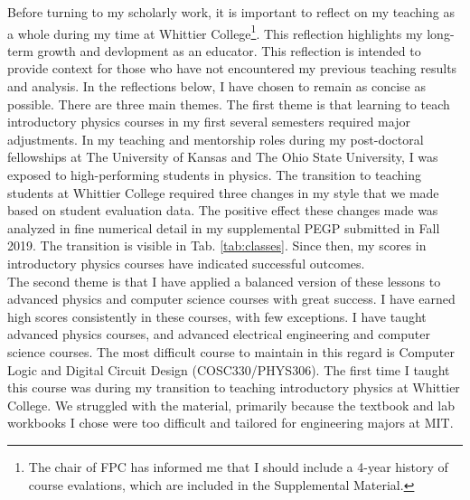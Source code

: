 \documentclass[../../../main.tex]{subfiles}
\begin{document}
Before turning to my scholarly work, it is important to reflect on my teaching as a whole during my time at Whittier College\footnote{The chair of FPC has informed me that I should include a 4-year history of course evalations, which are included in the Supplemental Material.}.  This reflection highlights my long-term growth and devlopment as an educator.  This reflection is intended to provide context for those who have not encountered my previous teaching results and analysis.  In the reflections below, I have chosen to remain as concise as possible.  There are three main themes.  The first theme is that learning to teach introductory physics courses in my first several semesters required major adjustments.  In my teaching and mentorship roles during my post-doctoral fellowships at The University of Kansas and The Ohio State University, I was exposed to high-performing students in physics.  The transition to teaching students at Whittier College required three changes in my style that we made based on student evaluation data.  The positive effect these changes made was analyzed in fine numerical detail in my supplemental PEGP submitted in Fall 2019.  The transition is visible in Tab. \ref{tab:classes}. Since then, my scores in introductory physics courses have indicated successful outcomes.
\\
\vspace{0.25cm}
The second theme is that I have applied a balanced version of these lessons to advanced physics and computer science courses with great success.  I have earned high scores consistently in these courses, with few exceptions.  I have taught advanced physics courses, and advanced electrical engineering and computer science courses.  The most difficult course to maintain in this regard is Computer Logic and Digital Circuit Design (COSC330/PHYS306).  The first time I taught this course was during my transition to teaching introductory physics at Whittier College.  We struggled with the material, primarily because the textbook and lab workbooks I chose were too difficult and tailored for engineering majors at MIT.
\\
\vspace{0.25cm}
\end{document}
